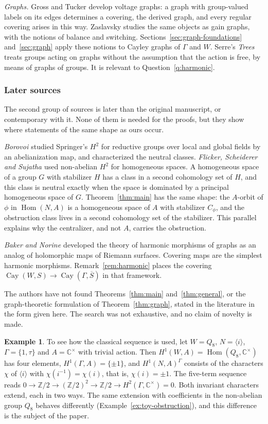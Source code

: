 \documentclass[12pt,letterpaper]{article}
\numberwithin{equation}{section}
\theoremstyle{plain}
\theoremstyle{definition}
\newtheorem{example}[theorem]{Example}
\newcommand{\Z}{\mathbb{Z}}
\newcommand{\C}{\mathbb{C}}
\DeclareMathOperator{\Hom}{Hom}
\DeclareMathOperator{\Cay}{Cay}
\begin{document}
\emph{Graphs.} Gross and Tucker \cite{GT87} develop voltage graphs: a
graph with group-valued labels on its edges determines a covering, the
derived graph, and every regular covering arises in this way. Zaslavsky
\cite{Za89} studies the same objects as gain graphs, with the notions of
balance and switching. Sections~\ref{sec:graph-foundations} and~\ref{sec:graph} apply these notions to
Cayley graphs of $\Gamma$ and $W$. Serre's \emph{Trees} \cite{Se80}
treats groups acting on graphs without the assumption that the action is
free, by means of graphs of groups. It is relevant to
Question~\ref{q:harmonic}.

\subsubsection{Later sources}

The second group of sources is later than the original manuscript, or
contemporary with it. None of them is needed for the proofs, but they
show where statements of the same shape as ours occur.

\emph{Borovoi \cite{Bo93}} studied Springer's $H^2$ for reductive groups
over local and global fields by an abelianization map, and characterized
the neutral classes. \emph{Flicker, Scheiderer and Sujatha \cite{FSS98}}
used non-abelian $H^2$ for homogeneous spaces. A homogeneous space of a
group $G$ with stabilizer $H$ has a class in a second cohomology set of
$H$, and this class is neutral exactly when the space is dominated by a
principal homogeneous space of $G$. Theorem~\ref{thm:main} has the same
shape: the $A$-orbit of $\phi$ in $\Hom(N,A)$ is a homogeneous space of
$A$ with stabilizer $C_\phi$, and the obstruction class lives in a second
cohomology set of the stabilizer. This parallel explains why the
centralizer, and not $A$, carries the obstruction.

\emph{Baker and Norine \cite{BN09}} developed the theory of harmonic
morphisms of graphs as an analog of holomorphic maps of Riemann surfaces.
Covering maps are the simplest harmonic morphisms.
Remark~\ref{rem:harmonic} places the covering
$\Cay(W,S)\to\Cay(\Gamma,\overline{S})$ in that framework.

The authors have not found Theorems~\ref{thm:main}
and~\ref{thm:general}, or the graph-theoretic formulation of
Theorem~\ref{thm:graph}, stated in the literature in the form given here.
The search was not exhaustive, and no claim of novelty is made.

\begin{example}\label{ex:lit}
To see how the classical sequence is used, let $W=Q_8$, $N=\langle
i\rangle$, $\Gamma=\{1,\tau\}$ and $A=\C^\times$ with trivial action.
Then $H^1(W,A)=\Hom(Q_8,\C^\times)$ has four elements,
$H^1(\Gamma,A)=\{\pm1\}$, and $H^1(N,A)^\Gamma$ consists of the
characters $\chi$ of $\langle i\rangle$ with $\chi(i^{-1})=\chi(i)$, that
is, $\chi(i)=\pm1$. The five-term sequence reads
$0\to\Z/2\to(\Z/2)^2\to\Z/2\to H^2(\Gamma,\C^\times)=0$. Both invariant
characters extend, each in two ways. The same extension with coefficients
in the non-abelian group $Q_8$ behaves differently
(Example~\ref{ex:toy-obstruction}), and this difference is the subject of
the paper.
\end{example}
\end{document}
